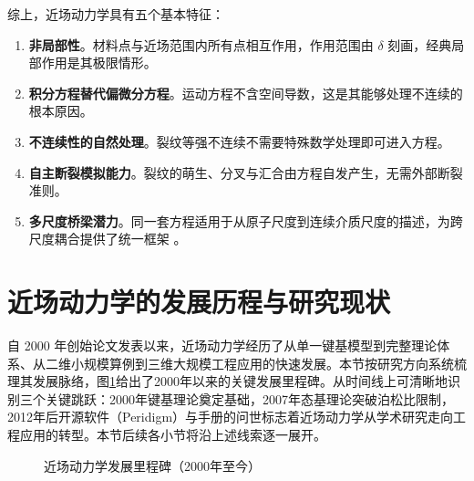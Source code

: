综上，近场动力学具有五个基本特征：
\begin{enumerate}
  \item \textbf{非局部性}。材料点与近场范围内所有点相互作用，作用范围由 $\delta$ 刻画，经典局部作用是其极限情形。
  \item \textbf{积分方程替代偏微分方程}。运动方程不含空间导数，这是其能够处理不连续的根本原因。
  \item \textbf{不连续性的自然处理}。裂纹等强不连续不需要特殊数学处理即可进入方程。
  \item \textbf{自主断裂模拟能力}。裂纹的萌生、分叉与汇合由方程自发产生，无需外部断裂准则。
  \item \textbf{多尺度桥梁潜力}。同一套方程适用于从原子尺度到连续介质尺度的描述，为跨尺度耦合提供了统一框架 \cite{Seleson2009,Silling2011coarsening}。
\end{enumerate}

\section{近场动力学的发展历程与研究现状}

自 2000 年创始论文发表以来，近场动力学经历了从单一键基模型到完整理论体系、从二维小规模算例到三维大规模工程应用的快速发展。本节按研究方向系统梳理其发展脉络，图\ref{fig:pd-timeline}给出了2000年以来的关键发展里程碑。从时间线上可清晰地识别三个关键跳跃：2000年键基理论奠定基础，2007年态基理论突破泊松比限制，2012年后开源软件（Peridigm）与手册的问世标志着近场动力学从学术研究走向工程应用的转型。本节后续各小节将沿上述线索逐一展开。

\begin{figure}[htbp]
  \centering
  \caption{近场动力学发展里程碑（2000年至今）}
  \label{fig:pd-timeline}
\end{figure}

